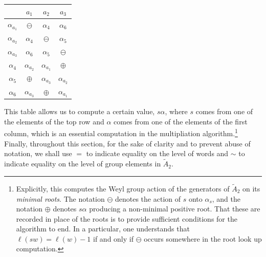 \documentclass{article}
\newtheorem{lemma}{Lemma}
\begin{document}
\begin{center}
    \begin{tabular}{|c|c|c|c|}
        \hline
         & $a_1$ & $a_2$ & $a_3$ \\
        \hline
        $\alpha_{a_1}$ & $\ominus$ & $\alpha_4$ & $\alpha_6$ \\
        \hline
        $\alpha_{a_2}$ & $\alpha_4$ &$\ominus$ & $\alpha_5$\\
        \hline
        $\alpha_{a_3}$ & $\alpha_6$ & $\alpha_5$ &$\ominus$ \\
        \hline
        $\alpha_4$ & $\alpha_{a_2}$ & $\alpha_{a_1}$ & $\oplus$ \\
        \hline
        $\alpha_5$ & $\oplus$ & $\alpha_{a_3}$ & $\alpha_{a_2}$\\
        \hline
        $\alpha_6$ & $\alpha_{a_3}$ &$\oplus$ & $\alpha_{a_1}$\\
        \hline
    \end{tabular}
\end{center}
This table allows us to compute a certain value, $s\alpha$, where $s$ comes from one of the elements of the top row and $\alpha$ comes from one of the elements of the first column, which is an essential computation in the multipliation algorithm.\footnote{Explicitly, this computes the Weyl group action of the generators of $\widetilde{A}_2$ on its \textit{minimal roots}\cite[p. 7]{casselman2008computationcoxetergroupsii}. The notation $\ominus$ denotes the action of $s$ onto $\alpha_s$, and the notation $\oplus$ denotes $s\alpha$ producing a non-minimal positive root. That these are recorded in place of the roots is to provide sufficient conditions for the algorithm to end. In a particular, one understands that $\ell(sw)=\ell(w)-1$ if and only if $\ominus$ occurs somewhere in the root look up computation.}  Finally, throughout this section, for the sake of clarity and to prevent abuse of notation, we shall use $=$ to indicate equality on the level of words and $\sim$ to indicate equality on the level of group elements in $\widetilde{A}_2$. 

\end{document}
